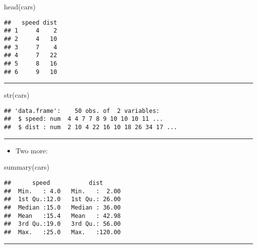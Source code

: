 \documentclass[
]{article}
\newenvironment{Shaded}{\begin{snugshade}}{\end{snugshade}}
\newcommand{\FunctionTok}[1]{\textcolor[rgb]{0.00,0.00,0.00}{#1}}
\newcommand{\NormalTok}[1]{#1}
\providecommand{\tightlist}{%
  \setlength{\itemsep}{0pt}\setlength{\parskip}{0pt}}
\begin{document}
\begin{Shaded}
\begin{Highlighting}[]
\FunctionTok{head}\NormalTok{(cars)}
\end{Highlighting}
\end{Shaded}

\begin{verbatim}
##   speed dist
## 1     4    2
## 2     4   10
## 3     7    4
## 4     7   22
## 5     8   16
## 6     9   10
\end{verbatim}

\begin{center}\rule{0.5\linewidth}{0.5pt}\end{center}

\begin{Shaded}
\begin{Highlighting}[]
\FunctionTok{str}\NormalTok{(cars)}
\end{Highlighting}
\end{Shaded}

\begin{verbatim}
## 'data.frame':    50 obs. of  2 variables:
##  $ speed: num  4 4 7 7 8 9 10 10 10 11 ...
##  $ dist : num  2 10 4 22 16 10 18 26 34 17 ...
\end{verbatim}

\begin{center}\rule{0.5\linewidth}{0.5pt}\end{center}

\begin{itemize}
\tightlist
\item
  Two more:
\end{itemize}

\begin{Shaded}
\begin{Highlighting}[]
\FunctionTok{summary}\NormalTok{(cars)}
\end{Highlighting}
\end{Shaded}

\begin{verbatim}
##      speed           dist       
##  Min.   : 4.0   Min.   :  2.00  
##  1st Qu.:12.0   1st Qu.: 26.00  
##  Median :15.0   Median : 36.00  
##  Mean   :15.4   Mean   : 42.98  
##  3rd Qu.:19.0   3rd Qu.: 56.00  
##  Max.   :25.0   Max.   :120.00
\end{verbatim}

\begin{center}\rule{0.5\linewidth}{0.5pt}\end{center}
\end{document}
